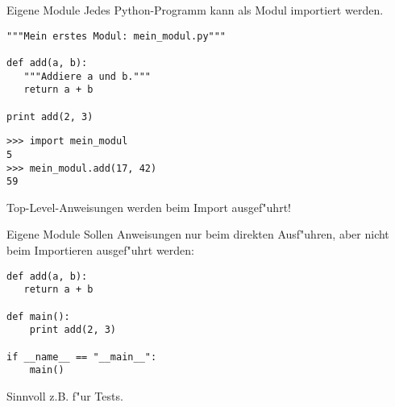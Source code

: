 \begin{frame}[fragile]{Eigene Module}
Jedes Python-Programm kann als Modul importiert werden.
\begin{lstlisting}[style=Python]
"""Mein erstes Modul: mein_modul.py"""

def add(a, b):
   """Addiere a und b."""
   return a + b

print add(2, 3)
\end{lstlisting}
\begin{lstlisting}[style=Shell]
>>> import mein_modul
5
>>> mein_modul.add(17, 42)
59
\end{lstlisting}
Top-Level-Anweisungen werden beim Import ausgef"uhrt!
\end{frame}

\begin{frame}[fragile]{Eigene Module}
Sollen Anweisungen nur beim direkten Ausf"uhren, aber nicht beim Importieren ausgef"uhrt werden:
\vspace{3mm}
\begin{lstlisting}[style=Python]
def add(a, b):
   return a + b

def main():
    print add(2, 3)

if __name__ == "__main__":
    main()
\end{lstlisting}
Sinnvoll z.B. f"ur Tests.
\end{frame}

